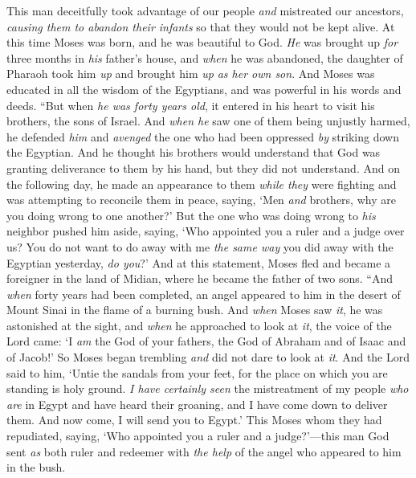 \begin{biblechapter}
\verse This man deceitfully took advantage of our people \textit{and} mistreated our ancestors, \textit{causing them to abandon their infants} so that they would not be kept alive.
\verse At this time Moses was born, and he was beautiful to God. \textit{He} was brought up \textit{for} three months in \textit{his} father’s house,
\verse and \textit{when} he was abandoned, the daughter of Pharaoh took him \textit{up} and brought him \textit{up} \textit{as her own son}.
\verse And Moses was educated in all the wisdom of the Egyptians, and was powerful in his words and deeds.
\verse “But when \textit{he was forty years old}, it entered in his heart to visit his brothers, the sons of Israel.
\verse And \textit{when he} saw one of them being unjustly harmed, he defended \textit{him} and \textit{avenged} the one who had been oppressed \textit{by} striking down the Egyptian.
\verse And he thought his brothers would understand that God was granting deliverance to them by his hand, but they did not understand.
\verse And on the following day, he made an appearance to them \textit{while they} were fighting and was attempting to reconcile them in peace, saying, ‘Men \textit{and} brothers, why are you doing wrong to one another?’
\verse But the one who was doing wrong to \textit{his} neighbor pushed him aside, saying, ‘Who appointed you a ruler and a judge over us?
\verse You do not want to do away with me \textit{the same way} you did away with the Egyptian yesterday, \textit{do you}?’
\verse And at this statement, Moses fled and became a foreigner in the land of Midian, where he became the father of two sons.
\verse “And \textit{when} forty years had been completed, an angel appeared to him in the desert of Mount Sinai in the flame of a burning bush.
\verse And \textit{when} Moses saw \textit{it}, he was astonished at the sight, and \textit{when} he approached to look at \textit{it}, the voice of the Lord came:
\verse ‘I \textit{am} the God of your fathers, the God of Abraham and of Isaac and of Jacob!’ So Moses began trembling \textit{and} did not dare to look at \textit{it}.
\verse And the Lord said to him, ‘Untie the sandals from your feet, for the place on which you are standing is holy ground.
\verse \textit{I have certainly seen} the mistreatment of my people \textit{who are} in Egypt and have heard their groaning, and I have come down to deliver them. And now come, I will send you to Egypt.’
\verse This Moses whom they had repudiated, saying, ‘Who appointed you a ruler and a judge?’—this man God sent \textit{as} both ruler and redeemer with \textit{the help} of the angel who appeared to him in the bush.

\end{biblechapter}
